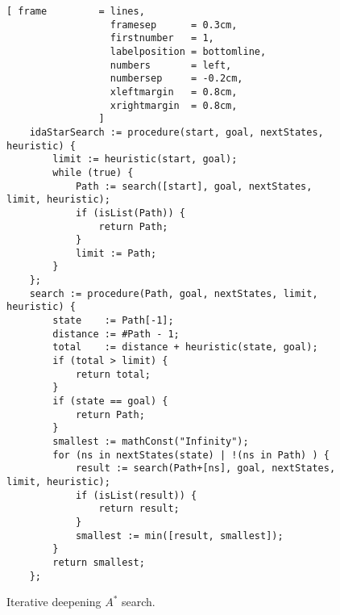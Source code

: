 \begin{figure}[!ht]
\centering
\begin{Verbatim}[ frame         = lines, 
                  framesep      = 0.3cm, 
                  firstnumber   = 1,
                  labelposition = bottomline,
                  numbers       = left,
                  numbersep     = -0.2cm,
                  xleftmargin   = 0.8cm,
                  xrightmargin  = 0.8cm,
                ]
    idaStarSearch := procedure(start, goal, nextStates, heuristic) {
        limit := heuristic(start, goal);
        while (true) {
            Path := search([start], goal, nextStates, limit, heuristic);
            if (isList(Path)) {
                return Path;
            }
            limit := Path;
        }
    };
    search := procedure(Path, goal, nextStates, limit, heuristic) {
        state    := Path[-1];
        distance := #Path - 1;
        total    := distance + heuristic(state, goal);
        if (total > limit) {
            return total;
        }
        if (state == goal) {
            return Path;
        }
        smallest := mathConst("Infinity");  
        for (ns in nextStates(state) | !(ns in Path) ) {
            result := search(Path+[ns], goal, nextStates, limit, heuristic);
            if (isList(result)) {
                return result;
            }
            smallest := min([result, smallest]);
        }
        return smallest;
    };
\end{Verbatim}
\vspace*{-0.3cm}
\caption{Iterative deepening $A^*$ search.}
\label{fig:iterative-deepening-a-star.stlx}
\end{figure}
